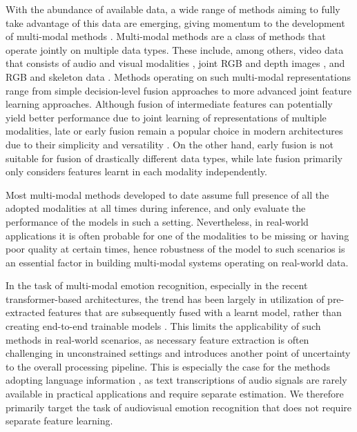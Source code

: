 \documentclass[a4paper,conference]{IEEEtran}
\begin{document}
With the abundance of available data, a wide range of methods aiming to fully take advantage of this data are emerging, giving momentum to the development of multi-modal methods \cite{mmtm, chumachenko2021speed, wang2020deep}. Multi-modal methods are a class of methods that operate jointly on multiple data types. These include, among others, video data that consists of audio and visual modalities \cite{xiao2020audiovisual}, joint RGB and depth images \cite{xiao2020multimodal}, and RGB and skeleton data \cite{ignore}. Methods operating on such multi-modal representations range from simple decision-level fusion approaches to more advanced joint feature learning approaches. Although fusion of intermediate features can potentially yield better performance due to joint learning of representations of multiple modalities, late or early fusion remain a popular choice in modern architectures due to their simplicity and versatility \cite{mmtm}. On the other hand, early fusion is not suitable for fusion of drastically different data types, while late fusion primarily only considers features learnt in each modality independently.

Most multi-modal methods developed to date assume full presence of all the adopted modalities at all times during inference, and only evaluate the performance of the models in such a setting. Nevertheless, in real-world applications it is often probable for one of the modalities to be missing or having poor quality at certain times, hence robustness of the model to such scenarios is an essential factor in building multi-modal systems operating on real-world data. 

In the task of multi-modal emotion recognition, especially in the recent transformer-based architectures, the trend has been largely in utilization of pre-extracted features that are subsequently fused with a learnt model, rather than creating end-to-end trainable models \cite{mult, interspeech, icasspav}. This limits the applicability of such methods in real-world scenarios, as necessary feature extraction is often challenging in unconstrained settings and introduces another point of uncertainty to the overall processing pipeline. This is especially the case for the methods adopting language information \cite{mult, interspeech}, as text transcriptions of audio signals are rarely available in practical applications and require separate estimation. We therefore primarily target the task of audiovisual emotion recognition that does not require separate feature learning.
\end{document}
